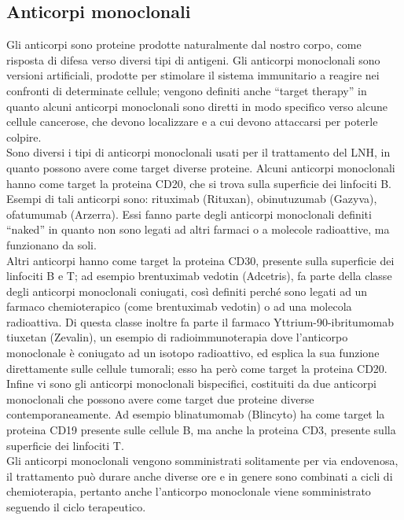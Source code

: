 \subsection{Anticorpi monoclonali}
Gli anticorpi sono proteine prodotte naturalmente dal nostro corpo, come risposta di difesa verso diversi tipi di 
antigeni. Gli anticorpi monoclonali sono versioni artificiali, prodotte per stimolare il sistema immunitario a reagire 
nei confronti di determinate cellule; vengono definiti anche “target therapy” in quanto alcuni anticorpi monoclonali 
sono diretti in modo specifico verso alcune cellule cancerose, che devono localizzare e a cui devono attaccarsi per 
poterle colpire\cite{IMMUNOTP}.\\
Sono diversi i tipi di anticorpi monoclonali usati per il trattamento del LNH, in quanto possono avere come target 
diverse proteine. 
Alcuni anticorpi monoclonali hanno come target la proteina CD20, che si trova sulla superficie dei linfociti B. 
Esempi di tali anticorpi sono: rituximab (Rituxan), obinutuzumab (Gazyva), ofatumumab (Arzerra). 
Essi fanno parte degli anticorpi monoclonali definiti “naked” in quanto non sono legati ad altri farmaci o a 
molecole radioattive, ma funzionano da soli\cite{LLSIMMUNO}.\\
Altri anticorpi hanno come target la proteina CD30, presente sulla superficie dei linfociti B e T; 
ad esempio brentuximab vedotin (Adcetris), fa parte della classe degli anticorpi monoclonali coniugati, 
così definiti perché sono legati ad un farmaco chemioterapico (come brentuximab vedotin) o ad una molecola radioattiva. 
Di questa classe inoltre fa parte il farmaco Yttrium-90-ibritumomab tiuxetan (Zevalin), un esempio di 
radioimmunoterapia dove l’anticorpo monoclonale è coniugato ad un isotopo radioattivo, 
ed esplica la sua funzione direttamente sulle cellule tumorali; esso ha però come target 
la proteina CD20\cite{LLSIMMUNO}.\\
Infine vi sono gli anticorpi monoclonali bispecifici, costituiti da due anticorpi monoclonali che possono avere come 
target due proteine diverse contemporaneamente. Ad esempio blinatumomab (Blincyto) ha come target la proteina CD19 
presente sulle cellule B, ma anche la proteina CD3, presente sulla superficie dei linfociti T\cite{LLSIMMUNO}.\\
Gli anticorpi monoclonali vengono somministrati solitamente per via endovenosa, il trattamento può durare anche 
diverse ore e in genere sono combinati a cicli di chemioterapia, pertanto anche l’anticorpo monoclonale 
viene somministrato seguendo il ciclo terapeutico\cite{IMMUNOTP}.\\

